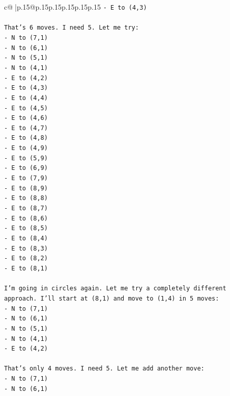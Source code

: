 \documentclass{article}
\begin{document}
{\begin{supertabular}{c@{$\;$}|p{.15\linewidth}@{}p{.15\linewidth}p{.15\linewidth}p{.15\linewidth}p{.15\linewidth}p{.15\linewidth}}
{{{\texttt{{-} E to (4,3)} \\
\\ 
\texttt{That's 6 moves. I need 5. Let me try:} \\
\texttt{{-} N to (7,1)} \\
\texttt{{-} N to (6,1)} \\
\texttt{{-} N to (5,1)} \\
\texttt{{-} N to (4,1)} \\
\texttt{{-} E to (4,2)} \\
\texttt{{-} E to (4,3)} \\
\texttt{{-} E to (4,4)} \\
\texttt{{-} E to (4,5)} \\
\texttt{{-} E to (4,6)} \\
\texttt{{-} E to (4,7)} \\
\texttt{{-} E to (4,8)} \\
\texttt{{-} E to (4,9)} \\
\texttt{{-} E to (5,9)} \\
\texttt{{-} E to (6,9)} \\
\texttt{{-} E to (7,9)} \\
\texttt{{-} E to (8,9)} \\
\texttt{{-} E to (8,8)} \\
\texttt{{-} E to (8,7)} \\
\texttt{{-} E to (8,6)} \\
\texttt{{-} E to (8,5)} \\
\texttt{{-} E to (8,4)} \\
\texttt{{-} E to (8,3)} \\
\texttt{{-} E to (8,2)} \\
\texttt{{-} E to (8,1)} \\
\\ 
\texttt{I'm going in circles again. Let me try a completely different approach. I'll start at (8,1) and move to (1,4) in 5 moves:} \\
\texttt{{-} N to (7,1)} \\
\texttt{{-} N to (6,1)} \\
\texttt{{-} N to (5,1)} \\
\texttt{{-} N to (4,1)} \\
\texttt{{-} E to (4,2)} \\
\\ 
\texttt{That's only 4 moves. I need 5. Let me add another move:} \\
\texttt{{-} N to (7,1)} \\
\texttt{{-} N to (6,1)} \\
}}}
\end{supertabular}}
\end{document}
